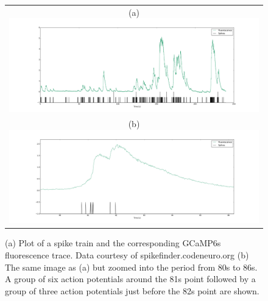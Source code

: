\documentclass[a4paper,12pt]{article}
\theoremstyle{definition}
\begin{document}
	\begin{figure}[h]
		\centering
		\begin{tabular}{c}
			(a)\includegraphics[width=\textwidth]{figures/fluoro_spike_plot_chen.png} \\
			(b)\includegraphics[width=\textwidth]{figures/zoomed_chen.png}
		\end{tabular}
		\caption{(a) Plot of a spike train and the corresponding GCaMP6s fluorescence trace. Data courtesy of spikefinder.codeneuro.org (b) The same image as (a) but zoomed into the period from 80s to 86s. A group of six action potentials around the 81s point followed by a group of three action potentials just before the 82s point are shown.}
		\label{fig:fluorescence_spikes}
	\end{figure}
\end{document}
